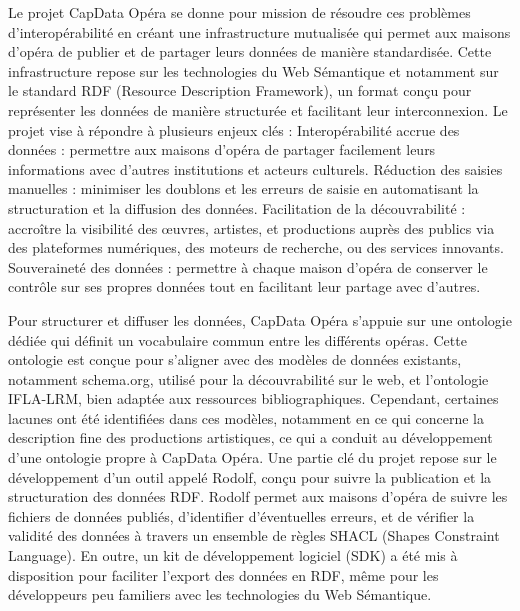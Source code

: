 Le projet CapData Opéra se donne pour mission de résoudre ces problèmes d'interopérabilité en créant une infrastructure mutualisée qui permet aux maisons d’opéra de publier et de partager leurs données de manière standardisée. Cette infrastructure repose sur les technologies du Web Sémantique et notamment sur le standard RDF (Resource Description Framework), un format conçu pour représenter les données de manière structurée et facilitant leur interconnexion.
Le projet vise à répondre à plusieurs enjeux clés :
Interopérabilité accrue des données : permettre aux maisons d'opéra de partager facilement leurs informations avec d'autres institutions et acteurs culturels.
Réduction des saisies manuelles : minimiser les doublons et les erreurs de saisie en automatisant la structuration et la diffusion des données.
Facilitation de la découvrabilité : accroître la visibilité des œuvres, artistes, et productions auprès des publics via des plateformes numériques, des moteurs de recherche, ou des services innovants.
Souveraineté des données : permettre à chaque maison d'opéra de conserver le contrôle sur ses propres données tout en facilitant leur partage avec d'autres. \newline

Pour structurer et diffuser les données, CapData Opéra s'appuie sur une ontologie dédiée qui définit un vocabulaire commun entre les différents opéras. Cette ontologie est conçue pour s'aligner avec des modèles de données existants, notamment schema.org, utilisé pour la découvrabilité sur le web, et l’ontologie IFLA-LRM, bien adaptée aux ressources bibliographiques. Cependant, certaines lacunes ont été identifiées dans ces modèles, notamment en ce qui concerne la description fine des productions artistiques, ce qui a conduit au développement d’une ontologie propre à CapData Opéra.
Une partie clé du projet repose sur le développement d’un outil appelé Rodolf, conçu pour suivre la publication et la structuration des données RDF. Rodolf permet aux maisons d'opéra de suivre les fichiers de données publiés, d'identifier d'éventuelles erreurs, et de vérifier la validité des données à travers un ensemble de règles SHACL (Shapes Constraint Language). En outre, un kit de développement logiciel (SDK) a été mis à disposition pour faciliter l’export des données en RDF, même pour les développeurs peu familiers avec les technologies du Web Sémantique. \newline


